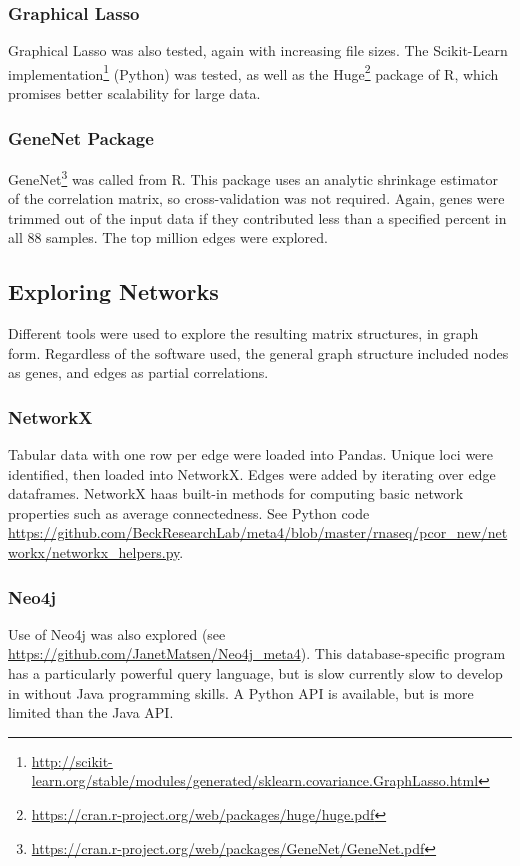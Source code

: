 \subsubsection{Graphical Lasso}
Graphical Lasso was also tested, again with increasing file sizes.
The Scikit-Learn implementation\footnote{\url{http://scikit-learn.org/stable/modules/generated/sklearn.covariance.GraphLasso.html}} \cite{scikit-learn} (Python) was tested, as well as the Huge\footnote{\url{https://cran.r-project.org/web/packages/huge/huge.pdf}} \cite{zhao2012}  package of R, which promises better scalability for large data.

\subsubsection{GeneNet Package}
GeneNet\footnote{\url{https://cran.r-project.org/web/packages/GeneNet/GeneNet.pdf}} was called from R.
This package uses an analytic shrinkage estimator of the correlation matrix, so cross-validation was not required.
Again, genes were trimmed out of the input data if they contributed less than a specified percent in all 88 samples.
The top million edges were explored.

\subsection{Exploring Networks}
Different tools were used to explore the resulting matrix structures, in graph form.
Regardless of the software used, the general graph structure included nodes as genes, and edges as partial correlations.

\subsubsection{NetworkX}
Tabular data with one row per edge were loaded into Pandas.
Unique loci were identified, then loaded into NetworkX.
Edges were added by iterating over edge dataframes.
NetworkX haas built-in methods for computing basic network properties such as average connectedness.
See Python code \url{https://github.com/BeckResearchLab/meta4/blob/master/rnaseq/pcor_new/networkx/networkx_helpers.py}.

\subsubsection{Neo4j}
Use of Neo4j was also explored (see \url{https://github.com/JanetMatsen/Neo4j_meta4}).
This database-specific program has a particularly powerful query language, but is slow currently slow to develop in without Java programming skills.
A Python API is available, but is more limited than the Java API.


